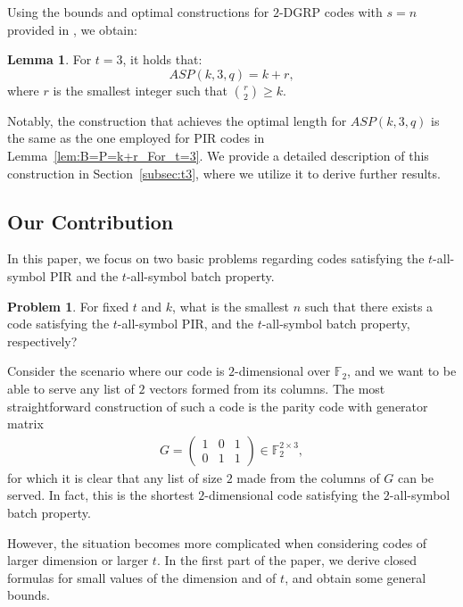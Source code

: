 \documentclass[11pt,a4paper]{article}
\theoremstyle{definition}
\newtheorem{lemma}[theorem]{Lemma}
\newtheorem{problem}{Problem}
\newcommand{\F}{\mathbb{F}}
\begin{document}
Using the bounds and optimal constructions 
for $2$-DGRP codes with $s=n$ provided in 
\cite[Theorem 1, Example 1]{KARINGULA_VARDY_WOOTTERS2022}, 
we obtain:


 \begin{lemma}\label{lem:ASP_For_t=3}
    For $t=3$, it holds that:
    \[
     ASP(k,3,q) = k + r,
    \]
    where $r$ is the smallest integer such that 
    $\binom{r}{2} \geq k$. 
 \end{lemma}
Notably, the construction that achieves the optimal  length for $ASP(k,3,q)$ is the same as the one 
employed for PIR codes in Lemma~\ref{lem:B=P=k+r_For_t=3}. 
We provide a detailed description of this construction in Section~\ref{subsec:t3}, where we utilize 
it to derive further results.


 
\subsection{Our Contribution}

In this paper, we focus on two basic problems regarding codes satisfying the $t$-all-symbol PIR and the $t$-all-symbol batch property. 

\begin{problem} \label{prob:1}
    For fixed $t$ and $k$, what is the smallest $n$ such that there exists a code satisfying the $t$-all-symbol PIR, and the $t$-all-symbol batch property, respectively?
\end{problem}

Consider the scenario where our code is $2$-dimensional over $\mathbb{F}_2$, and we want to be able to serve any list of $2$ vectors formed from its columns. The most straightforward construction of such a code is the parity code with generator matrix
\begin{align*}
G=\begin{pmatrix}
1 & 0 & 1 \\
0 & 1 & 1
\end{pmatrix} \in \F_2^{2 \times 3},\end{align*}
for which it is clear that any list of size $2$ made from the columns of $G$ can be served. In fact, this is the shortest $2$-dimensional code satisfying the $2$-all-symbol batch property.

However, the situation becomes more complicated when considering codes of larger dimension or larger $t$. In the first part of the paper, we derive closed formulas for small values of the dimension and of $t$, and obtain some general bounds.
\end{document}
